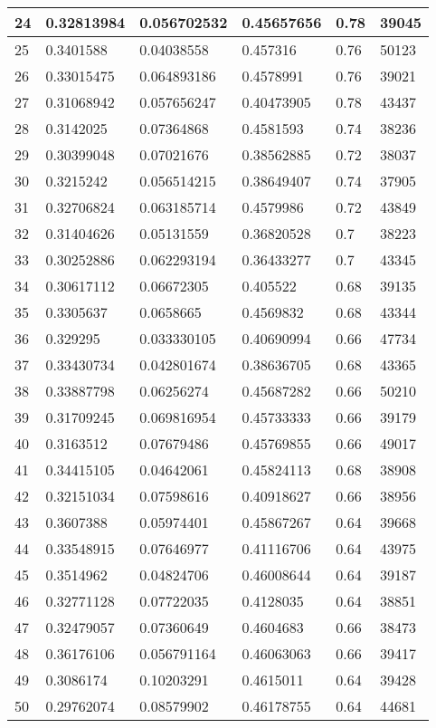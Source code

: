 \begin{longtable}{|l|l|l|l|l|l|}
24 & 0.32813984 & 0.056702532 & 0.45657656 & 0.78 & 39045 \\ \hline 
25 & 0.3401588 & 0.04038558 & 0.457316 & 0.76 & 50123 \\ \hline 
26 & 0.33015475 & 0.064893186 & 0.4578991 & 0.76 & 39021 \\ \hline 
27 & 0.31068942 & 0.057656247 & 0.40473905 & 0.78 & 43437 \\ \hline 
28 & 0.3142025 & 0.07364868 & 0.4581593 & 0.74 & 38236 \\ \hline 
29 & 0.30399048 & 0.07021676 & 0.38562885 & 0.72 & 38037 \\ \hline 
30 & 0.3215242 & 0.056514215 & 0.38649407 & 0.74 & 37905 \\ \hline 
31 & 0.32706824 & 0.063185714 & 0.4579986 & 0.72 & 43849 \\ \hline 
32 & 0.31404626 & 0.05131559 & 0.36820528 & 0.7 & 38223 \\ \hline 
33 & 0.30252886 & 0.062293194 & 0.36433277 & 0.7 & 43345 \\ \hline 
34 & 0.30617112 & 0.06672305 & 0.405522 & 0.68 & 39135 \\ \hline 
35 & 0.3305637 & 0.0658665 & 0.4569832 & 0.68 & 43344 \\ \hline 
36 & 0.329295 & 0.033330105 & 0.40690994 & 0.66 & 47734 \\ \hline 
37 & 0.33430734 & 0.042801674 & 0.38636705 & 0.68 & 43365 \\ \hline 
38 & 0.33887798 & 0.06256274 & 0.45687282 & 0.66 & 50210 \\ \hline 
39 & 0.31709245 & 0.069816954 & 0.45733333 & 0.66 & 39179 \\ \hline 
40 & 0.3163512 & 0.07679486 & 0.45769855 & 0.66 & 49017 \\ \hline 
41 & 0.34415105 & 0.04642061 & 0.45824113 & 0.68 & 38908 \\ \hline 
42 & 0.32151034 & 0.07598616 & 0.40918627 & 0.66 & 38956 \\ \hline 
43 & 0.3607388 & 0.05974401 & 0.45867267 & 0.64 & 39668 \\ \hline 
44 & 0.33548915 & 0.07646977 & 0.41116706 & 0.64 & 43975 \\ \hline 
45 & 0.3514962 & 0.04824706 & 0.46008644 & 0.64 & 39187 \\ \hline 
46 & 0.32771128 & 0.07722035 & 0.4128035 & 0.64 & 38851 \\ \hline 
47 & 0.32479057 & 0.07360649 & 0.4604683 & 0.66 & 38473 \\ \hline 
48 & 0.36176106 & 0.056791164 & 0.46063063 & 0.66 & 39417 \\ \hline 
49 & 0.3086174 & 0.10203291 & 0.4615011 & 0.64 & 39428 \\ \hline 
50 & 0.29762074 & 0.08579902 & 0.46178755 & 0.64 & 44681 \\ \hline 
\end{longtable}